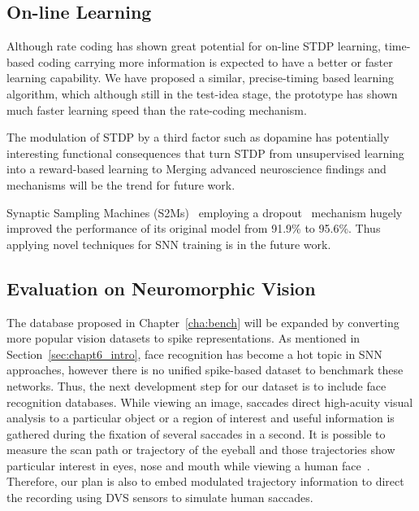 \subsection[On-line  Biologically-Plausible Learning]{On-line \protect{} \protect{} Learning}
Although rate coding has shown great potential for on-line STDP learning, time-based coding carrying more information is expected to have a better or faster learning capability.
We have proposed a similar, precise-timing based learning algorithm, which although still in the test-idea stage, the prototype has shown much faster learning speed than the rate-coding mechanism.

The modulation of STDP by a third factor such as dopamine has potentially interesting functional consequences that turn STDP from unsupervised learning into a reward-based learning \protect{} \protect{}\citep{izhikevich2007solving}\protect{} to \protect{}  \protect{}
Merging advanced neuroscience findings and \protect{} \protect{} mechanisms \protect{} \protect{} will be the trend for future work.


Synaptic Sampling Machines (S2Ms)~\citep{neftci2016stochastic} employing a dropout~\citep{srivastava2014dropout} mechanism \protect{} hugely improved the performance of its original model from 91.9\% to 95.6\%.
Thus applying novel \protect{} \protect{} techniques for SNN training is in the future work.


\subsection{Evaluation on Neuromorphic Vision}
The database proposed in Chapter~\ref{cha:bench} will be expanded by converting more popular vision datasets to spike representations.
As mentioned in Section~\ref{sec:chapt6_intro}, face recognition has become a hot topic in SNN approaches, however there is no unified spike-based dataset to benchmark these networks.
Thus, the next development step for our dataset is to include face recognition databases.
While viewing an image, saccades direct high-acuity visual analysis to a particular object or a region of interest and useful information is gathered during the fixation of several saccades in a second.
It is possible to measure the scan path or trajectory of the eyeball and those trajectories show particular interest in eyes, nose and mouth while viewing a human face~\citep{yarbus1967eye}.
Therefore, our plan is also to embed modulated trajectory information to direct the recording using DVS sensors to simulate human saccades.

